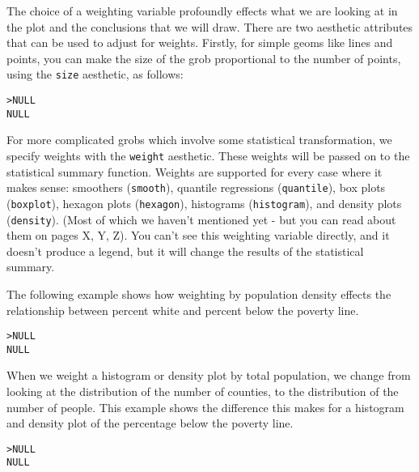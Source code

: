 \noindent The choice of a weighting variable profoundly effects what we are looking at in the plot and the conclusions that we will draw.  There are two aesthetic attributes that can be used to adjust for weights.  Firstly, for simple geoms like lines and points, you can make the size of the grob proportional to the number of points, using the {\tt size} aesthetic, as follows:

\begin{alltt}
> NULL
NULL
\end{alltt}

For more complicated grobs which involve some statistical transformation, we specify weights with the {\tt weight} aesthetic.  These weights will be passed on to the statistical summary function.  Weights are supported for every case where it makes sense: smoothers ({\tt smooth}), quantile regressions ({\tt quantile}), box plots ({\tt boxplot}), hexagon plots ({\tt hexagon}), histograms ({\tt histogram}), and density plots ({\tt density}).  (Most of which we haven't mentioned yet - but you can read about them on pages X, Y, Z).  You can't see this weighting variable directly, and it doesn't produce a legend, but it will change the results of the statistical summary.

The following example shows how weighting by population density effects the relationship between percent white and percent below the poverty line.

\begin{alltt}
> NULL
NULL
\end{alltt}

When we weight a histogram or density plot by total population, we change from looking at the distribution of the number of counties, to the distribution of the number of people.  This example shows the difference this makes for a histogram and density plot of the percentage below the poverty line.

\begin{alltt}
> NULL
NULL
\end{alltt}

